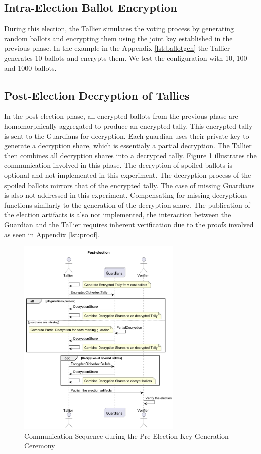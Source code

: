 \subsection{Intra-Election Ballot Encryption}
During this election, the Tallier simulates the voting process by generating random ballots and encrypting them using the joint key established in the previous phase. In the example in the Appendix \ref{lst:ballotgen} the Tallier generates 10 ballots and encrypts them. We test the configuration with 10, 100 and 1000 ballots.

\subsection{Post-Election Decryption of Tallies}
In the post-election phase, all encrypted ballots from the previous phase are homomorphically aggregated to produce an encrypted tally. This encrypted tally is sent to the Guardians for decryption. Each guardian uses their private key to generate a decryption share, which is essentialy a partial decryption. The Tallier then combines all decryption shares into a decrypted tally. Figure \ref{Fig:comm-post} illustrates the communication involved in this phase. The decryption of spoiled ballots is optional and not implemented in this experiment. The decryption process of the spoiled ballots mirrors that of the encrypted tally. The case of missing Guardians is also not addressed in this experiment. Compensating for missing decryptions functions similarly to the generation of the decryption share. The publication of the election artifacts is also not implemented, the interaction between the Guardian and the Tallier requires inherent verification due to the proofs involved as seen in Appendix \ref{lst:proof}.

\begin{figure}
    \centering
    \includegraphics[width=0.7\textwidth]{abbildungen/Diagramme/communication-seq2.png}
    \caption{Communication Sequence during the Pre-Election Key-Generation Ceremony}
    \label{Fig:comm-post}
\end{figure}

